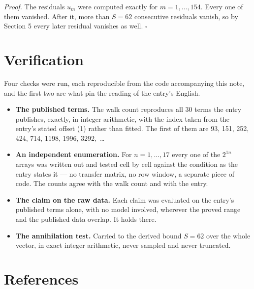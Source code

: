 \documentclass[11pt]{article}
\theoremstyle{definition}
\begin{document}
{\itshape Proof.} The residuals $u_m$ were computed exactly for $m = 1,\dots,154$. Every one of them vanished. After it, more than $S = 62$ consecutive residuals vanish, so by Section 5 every later residual vanishes as well. $\square$

\section{Verification}

Four checks were run, each reproducible from the code accompanying this note, and the first two are what pin the reading of the entry's English.

\begin{itemize}

\item {\bfseries The published terms.} The walk count reproduces all 30 terms the entry publishes, exactly, in integer arithmetic, with the index taken from the entry's stated offset (1) rather than fitted. The first of them are 93, 151, 252, 424, 714, 1198, 1996, 3292,~\dots

\item {\bfseries An independent enumeration.} For $n = 1,\dots,17$ every one of the $2^{1n}$ arrays was written out and tested cell by cell against the condition as the entry states it --- no transfer matrix, no row window, a separate piece of code. The counts agree with the walk count and with the entry.

\item {\bfseries The claim on the raw data.} Each claim was evaluated on the entry's published terms alone, with no model involved, wherever the proved range and the published data overlap. It holds there.

\item {\bfseries The annihilation test.} Carried to the derived bound $S = 62$ over the whole vector, in exact integer arithmetic, never sampled and never truncated.

\end{itemize}

\section{References}
\end{document}
